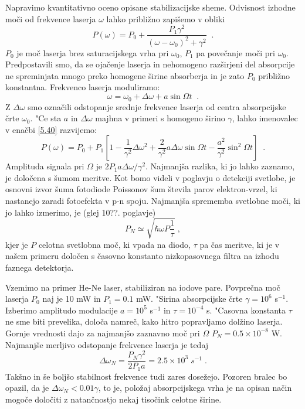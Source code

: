 Napravimo kvantitativno oceno opisane stabilizacijske sheme. Odvisnost
izhodne moči od frekvence laserja $\omega$ lahko približno zapišemo v
obliki 
\begin{equation}  \label{5.40}
P(\omega)=P_0 + \frac{P_1\gamma^2}{(\omega- \omega_0)^2+\gamma^2}\;\;.
\end{equation}
$P_0$ je moč laserja brez saturacijskega vrha pri $\omega_0$, $P_1$ pa
povečanje moči pri $\omega_0$. Predpostavili smo, da se ojačenje laserja
in nehomogeno razširjeni del absorpcije ne spreminjata mnogo preko homogene
širine absorberja in je zato $P_0$ približno konstantna. Frekvenco laserja
moduliramo: 
\begin{equation}  \label{5.41}
\omega=\omega_0+\Delta\omega+a \sin \Omega t\;\;.
\end{equation}
Z $\Delta\omega$ smo označili odstopanje srednje frekvence laserja od
centra absorpcijske črte $\omega_0$. "Ce sta $a$ in $\Delta\omega$ majhna v
primeri s homogeno širino $\gamma$, lahko imenovalec v enačbi \ref{5.40}
razvijemo: 
\begin{equation}  \label{5.42}
P(\omega)=P_0+P_1 [1-\frac{1}{\gamma^2}\Delta\omega^2 +\frac{2}{\gamma^2} a
\Delta\omega \sin\Omega t - \frac{a^2}{\gamma^2}\sin^2\Omega t ]\;\;.
\end{equation}
Amplituda signala pri $\Omega$ je $2P_1 a \Delta\omega/\gamma^2$. Najmanjša
razlika, ki jo lahko zaznamo, je določena s šumom meritve. Kot bomo videli
v poglavju o detekciji svetlobe, je osnovni izvor šuma fotodiode Poissonov
šum števila parov elektron-vrzel, ki nastanejo zaradi fotoefekta v p-n
spoju. Najmanjša sprememba svetlobne moči, ki jo lahko izmerimo, je (glej
10??. poglavje) 
\begin{equation}  \label{5.43}
P_N\simeq \sqrt{\hbar\omega P \frac{1}{\tau}}\;,
\end{equation}
kjer je $P$ celotna svetlobna moč, ki vpada na diodo, $\tau$ pa čas
meritve, ki je v našem primeru določen s časovno konstanto nizkopasovnega
filtra na izhodu faznega detektorja.

Vzemimo na primer He-Ne laser, stabiliziran na iodove pare. Povprečna moč
laserja $P_0$ naj je 10 mW in $P_1=0.1 $ mW. "Sirina absorpcijske črte $%
\gamma= 10^6$ s$^{-1}$. Izberimo amplitudo modulacije $a=10^5$ s$^{-1}$ in $%
\tau=10^{-4}$ s. "Casovna konstanta $\tau$ ne sme biti prevelika, določa
namreč, kako hitro popravljamo dolžino laserja. Gornje vrednosti dajo
za najmanjšo zaznavno moč pri $\Omega$ $P_N=0.5\times10^{-8}$ W.
Najmanjše merljivo odstopanje frekvence laserja je tedaj 
\begin{equation}  \label{5.44}
\Delta\omega_N=\frac{P_N \gamma^2}{2P_1 a}=2.5\times 10^3\;s^{-1}\;.
\end{equation}
Takšno in še boljšo stabilnost frekvence tudi zares dosežejo. Pozoren
bralec bo opazil, da je $\Delta\omega_N<0.01 \gamma$, to je, položaj
absorpcijskega vrha je na opisan način mogoče določiti z natančnostjo
nekaj tisočink celotne širine.

